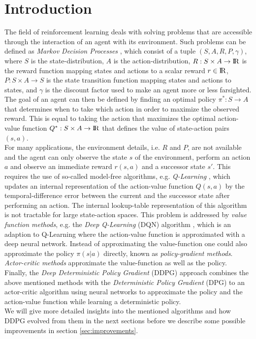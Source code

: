 \section{Introduction}
\label{sec:intro}
The field of reinforcement learning deals with solving problems that are accessible through the interaction of an agent with its environment. Such problems can be defined as \textit{Markov Decision Processes} \citep{howard1960dynamic}, which consist of a tuple $(S, A, R, P, \gamma)$, where $S$ is the state-distribution, $A$ is the action-distribution, $R:S\times A\rightarrow {\rm I\!R}$ is the reward function mapping states and actions to a scalar reward $r\in{\rm I\!R}$, $P:S\times  A \rightarrow S$ is the state transition function mapping states and actions to states, and $\gamma$ is the discount factor used to make an agent more or less farsighted. The goal of an agent can then be defined by finding an optimal policy $\pi^*:S\rightarrow A$ that determines when to take which action in order to maximize the observed reward. This is equal to taking the action that maximizes the optimal action-value function $Q^*:S \times A \rightarrow {\rm I\!R}$ that defines the value of state-action pairs $(s, a)$.\\ 
For many applications, the environment details, i.e. $R$ and $P$, are not available and the agent can only observe the state $s$ of the environment, perform an action $a$ and observe an immediate reward $r(s,a)$ and a successor state $s'$. This requires the use of so-called model-free algorithms, e.g. \textit{Q-Learning} \citep{watkins1992q}, which updates an internal representation of the action-value function $Q(s,a)$ by the temporal-difference error between the current and the successor state after performing an action. The internal lookup-table representation of this algorithm is not tractable for large state-action spaces. This problem is addressed by \textit{value function methods}, e.g. the \textit{Deep Q-Learning} (DQN) algorithm \citep{mnih2013playing}, which is an adaption to Q-Learning where the action-value function is approximated with a deep neural network. Instead of approximating the value-function one could also approximate the policy $\pi(s|a)$ directly, known as \textit{policy-gradient methods}. \textit{Actor-critic methods} \citep{konda2000actor} approximate the value-function as well as the policy.\\
Finally, the \textit{Deep Deterministic Policy Gradient} (DDPG) approach \citep{lillicrap2015continuous} combines the above mentioned methods with the \textit{Deterministic Policy Gradient} (DPG) \citep{silver2014deterministic} to an actor-critic algorithm using neural networks to approximate the policy and the action-value function while learning a deterministic policy.\\
We will give more detailed insights into the mentioned algorithms and how DDPG evolved from them in the next sections before we describe some possible improvements in section \ref{sec:improvements}.

